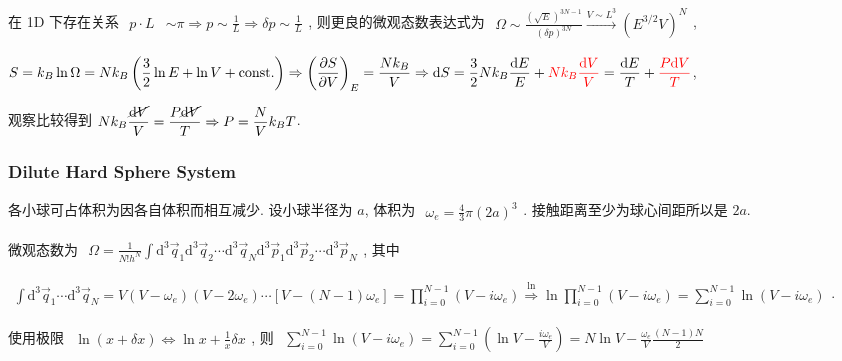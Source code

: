 \documentclass[../../main.tex]{subfiles}
\begin{document}
在 1D 下存在关系 $\begin{aligned}
    p\cdot L&\sim \pi\Rightarrow p\sim \frac{1}{L}\Rightarrow\delta p\sim \frac{1}{L}
\end{aligned}$, 则更良的微观态数表达式为 $\begin{aligned}
    \Omega\sim \frac{(\sqrt{E})^{3N-1}}{(\delta p)^{3N}}\stackrel{V\sim L^{3}}{\longrightarrow} \left(E^{3/2}V\right)^{N}
\end{aligned}$,

$\begin{aligned}
    S = k_{B}\ln{\Omega} = Nk_{B}\left(\frac{3}{2}\ln{E} + \ln{V} + \text{const.}\right)\Rightarrow \left(\frac{\partial S}{\partial V}\right)_{E} = \frac{Nk_{B}}{V}\Rightarrow \mathrm{d}S = \frac{3}{2}Nk_{B}\frac{\mathrm{d}E}{E} + {\color{red}{Nk_{B}\frac{\mathrm{d}V}{V}}} = \frac{\mathrm{d}E}{T} + {\color{red}{\frac{P\mathrm{d}V}{T}}}
\end{aligned}$, 
    
观察比较得到 $\begin{aligned}
    Nk_{B}\frac{\cancel{\mathrm{d}V}}{V} =\frac{P\cancel{\mathrm{d}V}}{T} \Rightarrow P = \frac{N}{V}k_{B}T
\end{aligned}$. 

\subsubsection{Dilute Hard Sphere System}
各小球可占体积为因各自体积而相互减少. 设小球半径为 $a$, 体积为 $\begin{aligned}
    \omega_{e} = \frac{4}{3}\pi(2a)^{3}
\end{aligned}$. 接触距离至少为球心间距所以是 $2a$. 

微观态数为 $\begin{aligned}
    \Omega = \frac{1}{N!h^{N}}\int\mathrm{d}^{3}\vec{q}_{1}\mathrm{d}^{3}\vec{q}_{2}\cdots\mathrm{d}^{3}\vec{q}_{N}\mathrm{d}^{3}\vec{p}_{1}\mathrm{d}^{3}\vec{p}_{2}\cdots\mathrm{d}^{3}\vec{p}_{N}
\end{aligned}$, 其中 

$\begin{aligned}
    \int\mathrm{d}^{3}\vec{q}_{1}\cdots\mathrm{d}^{3}\vec{q}_{N} = V(V-\omega_{e})(V-2\omega_{e})\cdots[V-(N-1)\omega_{e}] = \prod_{i=0}^{N-1}(V-i\omega_{e})
    \stackrel{\ln}{\Rightarrow} 
    \ln{\prod_{i=0}^{N-1}(V-i\omega_{e})} = \sum_{i=0}^{N-1}\ln{(V-i\omega_{e})}
\end{aligned}$. 

使用极限 $\begin{aligned}
    \ln{(x+\delta x)} \Leftrightarrow \ln{x} + \frac{1}{x}\delta x
\end{aligned}$, 则 $\begin{aligned}
    \sum_{i=0}^{N-1}\ln{(V-i\omega_{e})} = \sum_{i=0}^{N-1}\left(\ln{V} - \frac{i\omega_{e}}{V}\right) = N\ln{V} - \frac{\omega_{e}}{V}\frac{(N-1)N}{2}
\end{aligned}$
\end{document}

